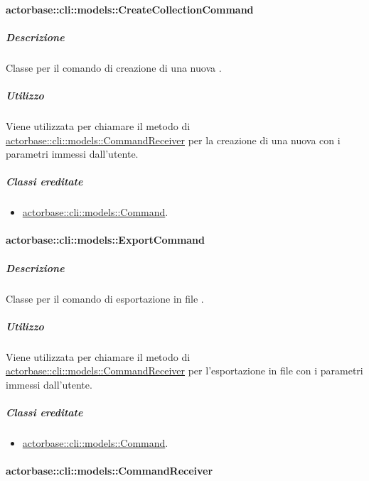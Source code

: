 \documentclass{scalatekids-article}
\begin{document}
\paragraph{actorbase::cli::models::CreateCollectionCommand}
\label{sec:actorbase::cli::models::CreateCollectionCommand}

\subparagraph{Descrizione}

Classe per il comando di creazione di una nuova .

\subparagraph{Utilizzo}

Viene utilizzata per chiamare il metodo di
\hyperref[sec:actorbase::cli::models::CommandReceiver]{actorbase::cli::models::CommandReceiver} per la creazione di una nuova
 con i parametri immessi dall'utente.

\subparagraph{Classi ereditate}

\begin{itemize}
\item \hyperref[sec:actorbase::cli::models::Command]{actorbase::cli::models::Command}.
\end{itemize}

\paragraph{actorbase::cli::models::ExportCommand}
\label{sec:actorbase::cli::models::ExportCommand}

\subparagraph{Descrizione}

Classe per il comando di esportazione in file .

\subparagraph{Utilizzo}

Viene utilizzata per chiamare il metodo di
\hyperref[sec:actorbase::cli::models::CommandReceiver]{actorbase::cli::models::CommandReceiver} per l'esportazione in file
 con i parametri immessi dall'utente.

\subparagraph{Classi ereditate}

\begin{itemize}
\item \hyperref[sec:actorbase::cli::models::Command]{actorbase::cli::models::Command}.
\end{itemize}

\paragraph{actorbase::cli::models::CommandReceiver}
\label{sec:actorbase::cli::models::CommandReceiver}
\end{document}
